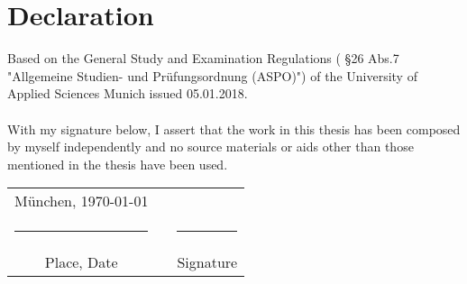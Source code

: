 \thispagestyle{plain}
\vspace*{1cm}

\section*{Declaration} 
Based on the General Study and Examination Regulations ( \S26 Abs.7 "Allgemeine Studien- und Pr\"ufungsordnung (ASPO)")  of the University of Applied Sciences Munich issued 05.01.2018.\\ \\

With my signature below, I assert that the work in this thesis has been composed by myself independently and no source materials or aids other than those mentioned in the thesis have been used.

\begin{center}
\vspace{2cm}

\hspace{1cm}\begin{tabular}{ccc}
\vspace{-0.3cm}M\"unchen, \today 	&\hspace{2cm} 		& \\
\rule{6cm}{0.8pt}					&					&\rule{6cm}{0.8pt}\\
Place, Date							&					& Signature			
\end{tabular}
\end{center}
           		

\begin{comment}
\vspace{4cm}
This work is licensed under the Creative Commons Attribution 3.0 Germany License. To view a copy of the license, visit http://creativecommons.org/licenses/by/3.0/de\\

Or\\

Send a letter to Creative Commons, 171 Second Street, Suite 300, San Francisco, California 94105, USA.

\begin{center}
\vspace{2cm}

\hspace{1cm}\begin{tabular}{ccc}
\vspace{-0.3cm}M\"unchen, \today 	&\hspace{4cm} 		& \\
\rule{6cm}{0.8pt}					&					&\rule{6cm}{0.8pt}\\
Place, Date							&					& Signature	
\end{tabular}
\end{center}
\end{comment}